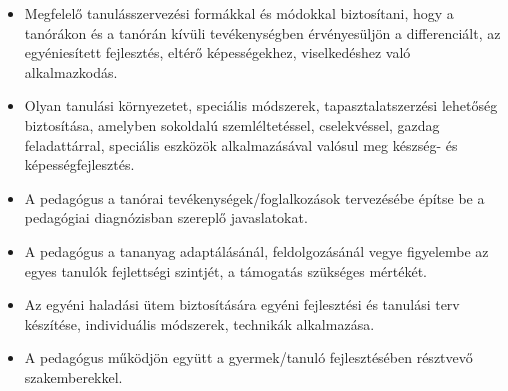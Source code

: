 \begin{itemize}
\item
  Megfelelő tanulásszervezési formákkal és módokkal biztosítani, hogy a
  tanórákon és a tanórán kívüli tevékenységben érvényesüljön a
  differenciált, az egyéniesített fejlesztés, eltérő képességekhez,
  viselkedéshez való alkalmazkodás.
\item
  Olyan tanulási környezetet, speciális módszerek, tapasztalatszerzési
  lehetőség biztosítása, amelyben sokoldalú szemléltetéssel,
  cselekvéssel, gazdag feladattárral, speciális eszközök alkalmazásával
  valósul meg készség- és képességfejlesztés.
\item
  A pedagógus a tanórai tevékenységek/foglalkozások tervezésébe építse
  be a pedagógiai diagnózisban szereplő javaslatokat.
\item
  A pedagógus a tananyag adaptálásánál, feldolgozásánál vegye figyelembe
  az egyes tanulók fejlettségi szintjét, a támogatás szükséges mértékét.
\item
  Az egyéni haladási ütem biztosítására egyéni fejlesztési és tanulási
  terv készítése, individuális módszerek, technikák alkalmazása.
\item
  A pedagógus működjön együtt a gyermek/tanuló fejlesztésében résztvevő
  szakemberekkel.
\end{itemize}
